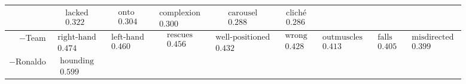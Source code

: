 \documentclass{beamer}
\begin{document}
\begin{frame}
\begin{tabular}{r|c c c c c c c c}
& $ \begin{matrix} \text{lacked} \\ 0.322 \end{matrix}$
& $ \begin{matrix} \text{onto} \\ 0.304 \end{matrix}$
& $ \begin{matrix} \text{complexion} \\ 0.300 \end{matrix}$
& $ \begin{matrix} \text{carousel} \\ 0.288 \end{matrix}$
& $ \begin{matrix} \text{cliché} \\ 0.286 \end{matrix}$
\\\hline
$-$Team
& $ \begin{matrix} \text{right-hand} \\ 0.474 \end{matrix}$
& $ \begin{matrix} \text{left-hand} \\ 0.460 \end{matrix}$
& $ \begin{matrix} \text{rescues} \\ 0.456 \end{matrix}$
& $ \begin{matrix} \text{well-positioned} \\ 0.432 \end{matrix}$
& $ \begin{matrix} \text{wrong} \\ 0.428 \end{matrix}$
& $ \begin{matrix} \text{outmuscles} \\ 0.413 \end{matrix}$
& $ \begin{matrix} \text{falls} \\ 0.405 \end{matrix}$
& $ \begin{matrix} \text{misdirected} \\ 0.399 \end{matrix}$
\\\hline
$-$Ronaldo
& $ \begin{matrix} \text{hounding} \\ 0.599 \end{matrix}$

\end{tabular}
\end{frame}
\end{document}
